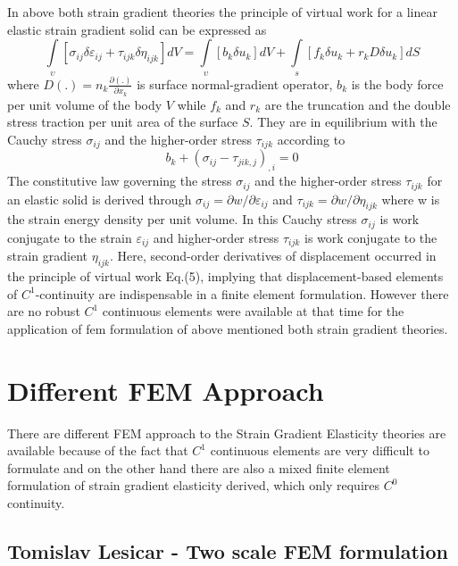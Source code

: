 \documentclass[12pt]{article}
\begin{document}
In above both strain gradient theories the principle of virtual work for a linear elastic strain gradient solid can be expressed as
\begin{equation}
\int\limits_\upsilon\! [\sigma_{ij} \delta\varepsilon_{ij} + \tau_{ijk}\delta\eta_{ijk}]  dV = \int\limits_\upsilon\! [b_k\delta u_k] dV + \int\limits_s \! [f_k\delta u_k+r_kD\delta u_k]dS
\end{equation}
where $D(.) = n_k\frac{\partial(.)}{\partial x_k}$ is surface normal-gradient operator, $b_k$ is the body force per unit volume
of the body $V$ while $f_k$ and $r_k$ are the truncation and the double stress traction per unit area of the surface $S$. They are in equilibrium with the Cauchy stress $\sigma_{ij}$ and the higher-order stress $\tau_{ijk}$ according to
\begin{equation}
b_k + (\sigma_{ij}-\tau_{jik,j})_{,i} = 0
\end{equation}
The constitutive law governing the stress $\sigma_{ij}$ and the higher-order stress $\tau_{ijk}$ for an elastic solid is derived through $\sigma_{ij} = \partial w / \partial \varepsilon_{ij}$ and $\tau_{ijk}= \partial w / \partial \eta_{ijk}$ where w is the strain energy density per unit volume. In this Cauchy stress $\sigma_{ij}$ is work conjugate to the strain $\varepsilon_{ij}$ and higher-order stress $\tau_{ijk}$ is work conjugate to the strain gradient  $\eta_{ijk}$.
\newline
\newline
Here, second-order derivatives of displacement occurred in the principle of virtual work Eq.(5), implying that displacement-based elements of $C^1$-continuity are indispensable in a finite element formulation. However there are no robust $C^1$ continuous elements were available at that time for the application of fem formulation of above mentioned both strain gradient theories.

\section{Different FEM Approach}
There are different FEM approach to the Strain Gradient Elasticity theories are available because of the fact that $C^1$ continuous elements are very difficult to formulate and on the other hand there are also a mixed finite element formulation of strain gradient elasticity derived, which only requires $C^0$ continuity.

\subsection{Tomislav Lesicar - Two scale FEM formulation} 
\end{document}
